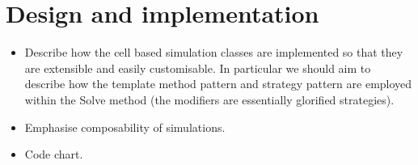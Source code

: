 \documentclass[superscriptaddress, a4paper]{article}
\begin{document}
\section{Design and implementation}
\label{sec:design and implementation}

\begin{itemize}
 \item Describe how the cell based simulation classes are implemented so that they are extensible and easily customisable. In particular we should aim to describe how the template method pattern and strategy pattern are employed within the Solve method (the modifiers are essentially glorified strategies).
 \item Emphasise composability of simulations. 
  \item Code chart.
\end{itemize}

\end{document}
